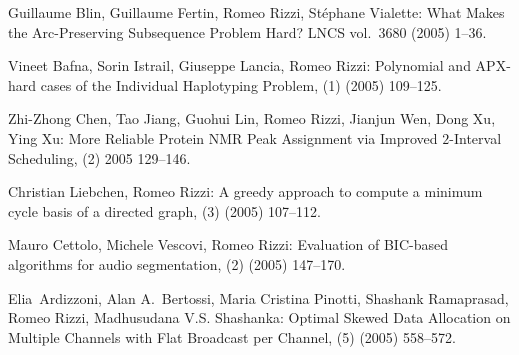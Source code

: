 \begin{etaremune}
  \item {\sc Guillaume Blin, Guillaume Fertin, Romeo Rizzi,
                  St\'ephane Vialette:}
   \newblock What Makes the Arc-Preserving Subsequence Problem Hard?
   \newblock  LNCS vol.~3680 (2005) 1--36.

  \item {\sc Vineet Bafna, Sorin Istrail, Giuseppe Lancia, Romeo Rizzi:}
   \newblock  Polynomial and APX-hard cases of the Individual Haplotyping Problem,
   (1) (2005) 109--125.

  \item {\sc Zhi-Zhong Chen, Tao Jiang, Guohui Lin, Romeo Rizzi,
                  Jianjun Wen, Dong Xu, Ying Xu:}
   \newblock  More Reliable Protein NMR Peak Assignment via Improved $2$-Interval Scheduling,
   (2) 2005 129--146.

  \item {\sc Christian Liebchen, Romeo Rizzi:}
   \newblock  A greedy approach to compute a minimum cycle basis
              of a directed graph,
   (3) (2005) 107--112.

  \item {\sc Mauro Cettolo, Michele Vescovi, Romeo Rizzi:}
   \newblock  Evaluation of BIC-based algorithms for audio segmentation,
   (2) (2005) 147--170.

  \item {\sc Elia~Ardizzoni, Alan A.~Bertossi, Maria Cristina Pinotti,
                  Shashank Ramaprasad,  Romeo Rizzi,  Madhusudana V.S. Shashanka:}
   \newblock  Optimal Skewed Data Allocation on Multiple Channels with Flat
              Broadcast per Channel,
   (5) (2005) 558--572.


\end{etaremune}
